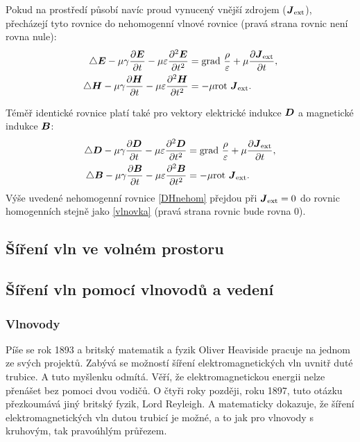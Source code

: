\documentclass[12pt,a4paper,oneside]{article}
\numberwithin{equation}{section} %
\numberwithin{figure}{section} %
\numberwithin{table}{section} %
\renewcommand{\vec}[1]{\mbox{\boldmath$#1$}} %
\newcommand{\grad}{\mathrm{grad}\ }
\newcommand{\rot}{\mathrm{rot}\ }
\begin{document}
Pokud na prostředí působí navíc proud vynucený vnější zdrojem ($\vec{J} _{\mathrm{ext}}$), přecházejí tyto rovnice do nehomogenní vlnové rovnice (pravá strana rovnic není rovna nule):
\begin{subequations}
\begin{align}
\triangle \vec{E} - \mu \gamma \frac{\partial \vec{E}}{\partial t} - \mu \varepsilon \frac{\partial ^2 \vec{E}}{\partial t ^2} &= \grad \frac{\rho}{\varepsilon} + \mu \frac{\partial \vec{J} _{\mathrm{ext}}}{\partial t} ,
\\
\triangle \vec{H} - \mu \gamma \frac{\partial \vec{H}}{\partial t} - \mu \varepsilon \frac{\partial ^2 \vec{H}}{\partial t ^2} &= - \mu \rot \vec{J} _{\mathrm{ext}}.
\end{align}
\end{subequations}

Téměř identické rovnice platí také pro vektory elektrické indukce $\vec{D}$ a magnetické indukce $\vec{B}$:
\begin{subequations}
\label{DHnehom}
\begin{align}
\triangle \vec{D} - \mu \gamma \frac{\partial \vec{D}}{\partial t} - \mu \varepsilon \frac{\partial ^2 \vec{D}}{\partial t ^2} &= \grad \frac{\rho}{\varepsilon} + \mu \frac{\partial \vec{J} _{\mathrm{ext}}}{\partial t} ,
\\
\triangle \vec{B} - \mu \gamma \frac{\partial \vec{B}}{\partial t} - \mu \varepsilon \frac{\partial ^2 \vec{B}}{\partial t ^2} &= - \mu \rot \vec{J} _{\mathrm{ext}}.
\end{align}
\end{subequations}
Výše uvedené nehomogenní rovnice \ref{DHnehom} přejdou při $\vec{J} _{\mathrm{ext}} = 0$ do rovnic homogenních stejně jako \ref{vlnovka} (pravá strana rovnic bude rovna 0).

\subsection{Šíření vln ve volném prostoru}


\newpage
\subsection{Šíření vln pomocí vlnovodů a vedení}
\subsubsection{Vlnovody}
Píše se rok 1893 a britský matematik a fyzik Oliver Heaviside pracuje na jednom ze svých projektů. Zabývá se možností šíření elektromagnetických vln uvnitř duté trubice. A tuto myšlenku odmítá. Věří, že elektromagnetickou energii nelze přenášet bez pomoci dvou vodičů. O čtyři roky později, roku 1897, tuto otázku přezkoumává jiný britský fyzik, Lord Reyleigh. A matematicky dokazuje, že šíření elektromagnetických vln dutou trubicí je možné, a to jak pro vlnovody s kruhovým, tak pravoúhlým průřezem.
\end{document}

